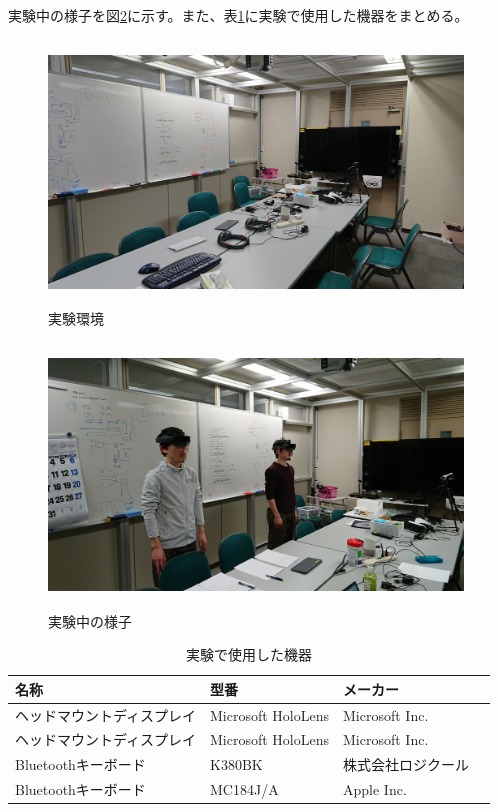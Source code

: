 \documentclass[11pt,a4j, titlepage]{jarticle} %
\begin{document}
実験中の様子を図\ref{fig:jikkenchu}に示す。また、表\ref{table:jikken_kiki}に実験で使用した機器をまとめる。

\begin{figure}[H]
  \begin{center}
    \includegraphics[clip,height=7.0cm,width=11.0cm]{./jikken_kankyo.eps}
    \caption{実験環境}
    \label{fig:jikken_kankyo}
  \end{center}
\end{figure}

\begin{figure}[H]
  \begin{center}
    \includegraphics[clip,height=7.0cm,width=11.0cm]{./jikkenchu.eps}
    \caption{実験中の様子}
    \label{fig:jikkenchu}
  \end{center}
\end{figure}

\begin{table}[H]
\caption{実験で使用した機器}
\label{table:jikken_kiki}
\begin{center}
\begin{tabular}{|l|l|l|}
\hline
名称 & 型番 & メーカー \\
\hline\hline
ヘッドマウントディスプレイ & Microsoft HoloLens & Microsoft Inc. \\
\hline
ヘッドマウントディスプレイ & Microsoft HoloLens & Microsoft Inc. \\
\hline
Bluetoothキーボード & K380BK & 株式会社ロジクール　\\
\hline
Bluetoothキーボード & MC184J/A & Apple Inc. \\
\hline
\end{tabular}
\end{center}
\end{table}
\end{document}
